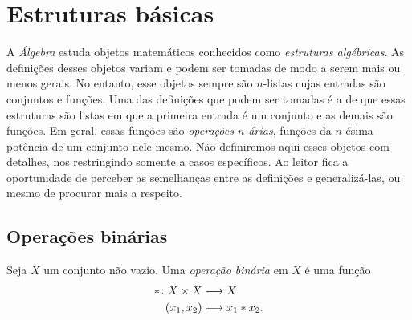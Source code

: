 
\chapter{Estruturas básicas}

A \emph{Álgebra} estuda objetos matemáticos conhecidos como \emph{estruturas algébricas}. As definições desses objetos variam e podem ser tomadas de modo a serem mais ou menos gerais. No entanto, esse objetos sempre são $n$-listas cujas entradas são conjuntos e funções. Uma das definições que podem ser tomadas é a de que essas estruturas são listas em que a primeira entrada é um conjunto e as demais são funções. Em geral, essas funções são \emph{operações $n$-árias}, funções da $n$-ésima potência de um conjunto nele mesmo. Não definiremos aqui esses objetos com detalhes, nos restringindo somente a casos específicos. Ao leitor fica a oportunidade de perceber as semelhanças entre as definições e generalizá-las, ou mesmo de procurar mais a respeito.

\section{Operações binárias}

\begin{definition}
Seja $X$ um conjunto não vazio. Uma \emph{operação binária} em $X$ é uma função
	\begin{align*}
	{\ast}\colon {X \times X} &\longrightarrow {X} \\{(x_1,x_2)} &\longmapsto x_1 \ast x_2.
	\end{align*}
\end{definition}

